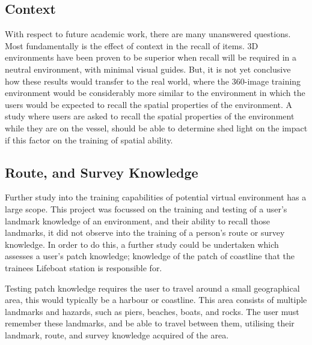\documentclass[ %
                    author={Elis Jones},
                supervisor={Dr. Kirsten Cater},
                    degree={BSc},
                     title={The Effect of Presentation Medium on Spatial Cognition},
                  subtitle={in the Virtual Environment},
                      year={2018} ]{dissertation}
\begin{document}
\subsection{Context}\label{further-context}
With respect to future academic work, there are many unanswered questions. Most fundamentally is the effect of context in the recall of items. 3D environments have been proven to be superior when recall will be required in a neutral environment, with minimal visual guides. But, it is not yet conclusive how these results would transfer to the real world, where the 360-image training environment would be considerably more similar to the environment in which the users would be expected to recall the spatial properties of the environment. A study where users are asked to recall the spatial properties of the environment while they are on the vessel, should be able to determine shed light on the impact if this factor on the training of spatial ability. 

\subsection{Route, and Survey Knowledge}
Further study into the training capabilities of potential virtual environment has a large scope. This project was focussed on the training and testing of a user's landmark knowledge of an environment, and their ability to recall those landmarks, it did not observe into the training of a person's route or survey knowledge. In order to do this, a further study could be undertaken which assesses a user's patch knowledge; knowledge of the patch of coastline that the trainees Lifeboat station is responsible for.

Testing patch knowledge requires the user to travel around a small geographical area, this would typically be a harbour or coastline. This area consists of multiple landmarks and hazards, such as piers, beaches, boats, and rocks. The user must remember these landmarks, and be able to travel between them, utilising their landmark, route, and survey knowledge acquired of the area. 



\clearpage


\end{document}
